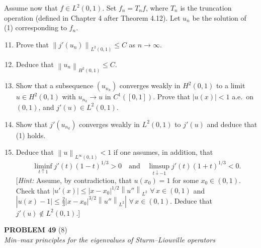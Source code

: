\documentclass[12pt]{article}
\newcommand{\norm}[1]{\left\|#1\right\|}
\newcommand{\abs}[1]{\left|#1\right|}
\begin{document}
\noindent Assume now that $f \in L^2(0,1)$. Set $f_n = T_n f$, where $T_n$ is the truncation
operation (defined in Chapter 4 after Theorem 4.12). Let $u_n$ be the solution of (1)
corresponding to $f_n$.
 
\begin{enumerate}
\setcounter{enumi}{10}
\item Prove that $\norm{j'(u_n)}_{L^2(0,1)} \le C$ as $n \to \infty$.
 
 
\item Deduce that $\norm{u_n}_{H^2(0,1)} \le C$.
 
\item Show that a subsequence $(u_{n_k})$ converges weakly in $H^2(0,1)$ to a limit
$u \in H^2(0,1)$ with $u_{n_k} \to u$ in $C^1([0,1])$. Prove that $\abs{u(x)} < 1$
a.e.\ on $(0,1)$, and $j'(u) \in L^2(0,1)$.
 
 
\item Show that $j'(u_{n_k})$ converges weakly in $L^2(0,1)$ to $j'(u)$ and deduce
that (1) holds.
 
 
\item Deduce that $\norm{u}_{L^\infty(0,1)} < 1$ if one assumes, in addition, that
\[
\liminf_{t \uparrow 1} j'(t)(1-t)^{1/3} > 0 \quad \text{and} \quad
\limsup_{t \downarrow -1} j'(t)(1+t)^{1/3} < 0.
\]
[\textit{Hint:} Assume, by contradiction, that $u(x_0) = 1$ for some $x_0 \in (0,1)$.
Check that $\abs{u'(x)} \le \abs{x - x_0}^{1/2}\norm{u''}_{L^2}$ $\forall\, x \in (0,1)$
and $\abs{u(x) - 1| \le \tfrac{2}{3}\abs{x - x_0}^{3/2}\norm{u''}_{L^2}}$ $\forall\, x \in (0,1)$.
Deduce that $j'(u) \notin L^2(0,1)$.]
\end{enumerate}
 
\bigskip
 
\noindent\textbf{PROBLEM 49} (8)\\[4pt]
\textit{Min--max principles for the eigenvalues of Sturm--Liouville operators}
 
\medskip
 
\end{document}

